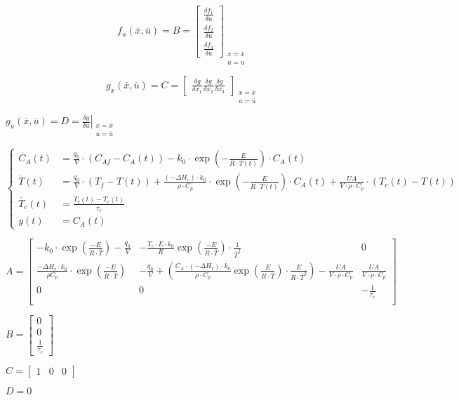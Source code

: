 \documentclass{report}
\begin{document}
	\begin{equation}
		f_u(\overline{x},\overline{u}) = B =
		\begin{bmatrix}
			\frac{\delta f_1}{\delta u} \\[5pt]
			\frac{\delta f_2}{\delta u} \\[5pt]
			\frac{\delta f_3}{\delta u}
		\end{bmatrix}_{\substack{x=\overline{x} \\ u=\overline{u}}}
	\end{equation}
	
		\begin{equation}
		g_x(\overline{x},\overline{u}) = C =
		\begin{bmatrix}
			\frac{\delta g}{\delta x_1} 
			\frac{\delta g}{\delta x_2}
			\frac{\delta g}{\delta x_3}
		\end{bmatrix}_{\substack{x=\overline{x} \\ u=\overline{u}}}
	\end{equation}
	
	$g_u(\overline{x}, \overline{u}) = D = \left.\frac{\delta g}{\delta u}\right|_{\substack{x=\overline{x} \\ u=\overline{u}}}$
	
	
	\begin{equation}
		\begin{cases}
			\dot{C_A}(t) &= \frac{q_0}{V}\cdot (C_{Af}-C_A(t))-k_0\cdot \exp \left({-\frac{E}{R\cdot T(t)}} \right) \cdot C_A(t) \\[7pt]
			\dot{T}(t)&=\frac{q_0}{V}\cdot (T_f-T(t))+ \frac{(-\Delta H_r)\cdot k_0}{\rho \cdot C_p}\cdot \exp{\left( -\frac{E}{R \cdot T(t)} \right)}\cdot C_A(t) + \frac{UA}{V\cdot\rho\cdot C_p}\cdot(T_c(t) - T(t))\\[7pt]
			\dot{T_c}(t) &= \frac{T_r(t)-T_c(t)}{\tau_c} \\[7pt]
			y(t) &= C_A(t)
		\end{cases}
	\end{equation}
	
	\begin{equation}
	A =
		\begin{bmatrix}
			-k_0\cdot \exp{\left(\frac{-E}{R\cdot \overline{T}}\right)}-\frac{q_0}{V} & - \frac{T_c\cdot E \cdot k_0}{R} \exp{\left(\frac{-E}{R\cdot\overline{T}} \right)}\cdot\frac{1}{\overline{T}^2} & 0 \\[10pt]
			
			\frac{-\Delta H_r \cdot k_0}{\rho C_p} \cdot\exp{\left(\frac{-E}{R\cdot \overline{T}}\right)}&-\frac{q_0}{V}+ (\frac{\overline{C}_A\cdot (-\Delta H_r)\cdot k_0}{\rho\cdot C_p} \exp{\left(\frac{E}{R \cdot\overline{T}} \right)}\cdot\frac{E}{R\cdot\overline{T}^2}) - \frac{UA}{V\cdot\rho\cdot C_p}  & \frac{UA}{V\cdot\rho\cdot C_p} \\[10pt]
			
			
			0 & 0 & -\frac{1}{\tau_c} \\			
		\end{bmatrix}
	\end{equation}
	
	$B = \begin{bmatrix}
		0 \\[5pt]
		0 \\[5pt]
		\frac{1}{\tau_c}
	\end{bmatrix}$
	
		$C = \begin{bmatrix}
		1 &
		0 &
		0 
	\end{bmatrix}$
	
	$D= 0$
\end{document}
